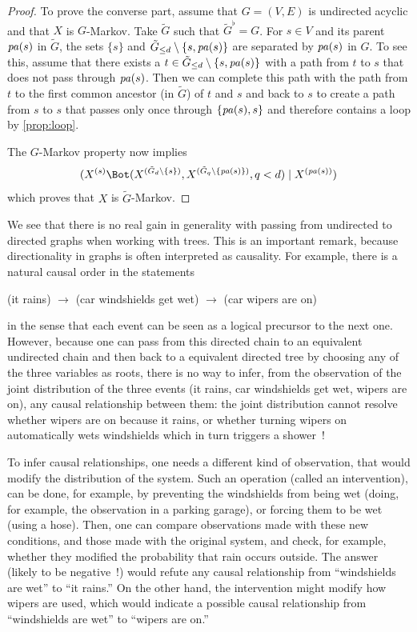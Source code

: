 \begin{proof}
To prove the converse part,  assume that $G=(V,E)$ is undirected acyclic and that $X$ is
$G$-Markov. Take $\tilde G$ such
that $\tilde G^\flat = G$. For $s\in V$ and its parent ${\mathit{pa}(s)}$ in
$\tilde G$, the sets $\{s\}$ and  $\tilde G_{\leq
d}\setminus \{s, {\mathit{pa}(s)}\}$ are separated by ${\mathit{pa}(s)}$ in $G$. To see this,  assume that there
exists a $t\in \tilde G_{\leq
d}\setminus \{s, {\mathit{pa}(s)}\}$ with a path from $t$ to $s$ that does not pass
through ${\mathit{pa}(s)}$. Then we can complete this path with the path from $t$
to the first common ancestor (in $\tilde G$) of $t$ and $s$ and back
to $s$ to create a  path from
$s$ to $s$ that passes only once through $\{{\mathit{pa}(s)}, s\}$  
and therefore contains a loop by  \cref{prop:loop}. 

The $G$-Markov property now implies 
$$
\cind{\pe Xs}{(\pe X{\tilde G_d\setm\{s\}}, \pe X{\tilde G_q\setm\{\pa{s}\}}, q<d)}{\pe X{\pa{s}}}
$$
which proves that $X$ is $\tilde G$-Markov.
\end{proof}

\begin{remark}
\label{rem:causality}
We see that there is no real gain in generality with passing from
undirected to directed graphs when working with trees. This is an
important remark, because directionality in graphs is often
interpreted as causality. For example, there is a natural causal order in the
statements
\begin{center}
(it rains) $\to$ (car windshields get wet) $\to$ (car wipers are on)
\end{center}
in the sense that each event can be seen as a logical precursor to the
next one. However, because one can pass from this directed chain to an
equivalent undirected chain and then back to a equivalent directed tree by choosing any of
the three variables as roots, there is no way to infer, from the
observation of the joint distribution of the three events (it rains, car windshields get wet, wipers are on), any causal relationship between them: the joint distribution
cannot resolve whether wipers are on because it rains, or whether
turning wipers on automatically wets windshields which in turn
triggers a shower~!


To infer causal relationships, one needs a different kind of
observation, that would modify the distribution of the system. Such an
operation (called an intervention), can be done, for example, by
preventing the windshields from being wet (doing, for example, the
observation in a parking garage), or forcing them to be wet (using a hose). Then, one can compare observations
made with these new conditions, and those made with the original
system, and check, for example, whether they modified the probability
that rain occurs outside. The answer (likely to be negative~!) would refute
any causal relationship from ``windshields are wet'' to ``it rains.'' On the
other hand, the intervention might modify how wipers are used,
which would indicate a possible causal relationship from ``windshields are wet'' to
``wipers are on.''
\end{remark}

